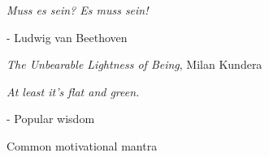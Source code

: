 
% 
% 
% 
% 


\begin{titlepage}
    \centering
\vspace*{5cm} %
\vspace*{\fill} %
{\Large \it Muss es sein? Es muss sein!}

\vspace{0.5cm}
{\large - Ludwig van Beethoven

\textit{The Unbearable Lightness of Being}, Milan Kundera
}

\vspace*{2cm} %
{\Large \it At least it's flat and green.}

\vspace{0.5cm}
{\large - Popular wisdom

Common motivational mantra
}

\end{titlepage}


\newpage